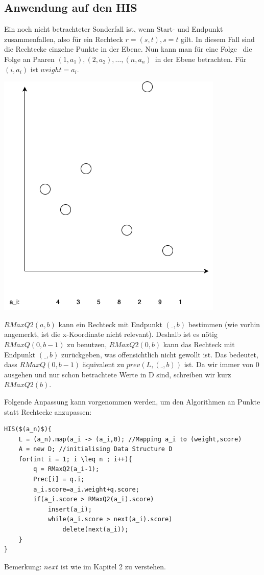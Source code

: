 \subsection{Anwendung auf den HIS}
Ein noch nicht betrachteter Sonderfall ist, wenn Start- und Endpunkt zusammenfallen, also für ein Rechteck $r=(s,t), s=t$ gilt. In diesem Fall sind die Rechtecke einzelne Punkte in der Ebene. Nun kann man für eine Folge \an ~die Folge an Paaren $(1,a_1),(2,a_2),\dots,(n,a_n)$~in der Ebene betrachten. Für $(i,a_i)$ ist $weight=a_i$.
\begin{center}
\includegraphics[scale=0.6]{./Pictures/HISGen.png}
\end{center}
\begin{bemerkung}
$RMaxQ2(a,b)$ kann ein Rechteck mit Endpunkt $(\_,b)$ bestimmen (wie vorhin angemerkt, ist die x-Koordinate nicht relevant). Deshalb ist es nötig $RMaxQ(0,b-1)$ zu benutzen, $RMaxQ2(0,b)$ kann das Rechteck mit Endpunkt $(\_,b)$ zurückgeben, was offensichtlich nicht gewollt ist. Das bedeutet, dass $RMaxQ(0,b-1)$ äquivalent zu $prev(L,(\_,b))$ ist.  Da wir immer von $0$ ausgehen und nur schon betrachtete Werte in D sind, schreiben wir kurz $RMaxQ2(b)$.
\end{bemerkung}
Folgende Anpassung kann vorgenommen werden, um den Algorithmen an Punkte statt Rechtecke anzupassen:
\begin{lstlisting}[mathescape]
HIS($(a_n)$){
    L = (a_n).map(a_i -> (a_i,0); //Mapping a_i to (weight,score)
    A = new D; //initialising Data Structure D
    for(int i = 1; i \leq n ; i++){
       	q = RMaxQ2(a_i-1);
       	Prec[i] = q.i;
       	a_i.score=a_i.weight+q.score;
       	if(a_i.score > RMaxQ2(a_i).score)
       		insert(a_i);
       		while(a_i.score > next(a_i).score)
       			delete(next(a_i));
    }
}
\end{lstlisting}
\begin{small}
    Bemerkung: $next$ ist wie im Kapitel 2 zu verstehen.
\end{small}

